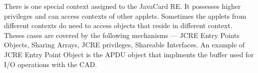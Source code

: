     There is one special context assigned to the JavaCard RE. It possesses higher privileges and can access contexts of other applets. Sometimes the applets from different contexts do need to access objects that reside in different context. Theses cases are covered by the following mechanisms --- JCRE Entry Points Objects, Sharing Arrays, JCRE privileges, Shareable Interfaces. An example of JCRE Entry Point Object is the APDU object that implments the buffer used for I/O operations with the CAD.





